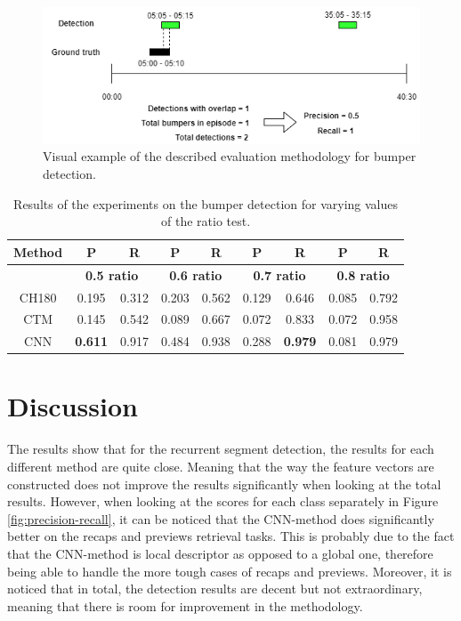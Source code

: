 \documentclass{article}
\begin{document}
\begin{figure}[H]
	\includegraphics[width=\textwidth]{images/evaluation-bumpers.png}
	\centering
	\caption{Visual example of the described evaluation methodology for bumper detection.}
	\label{fig:evaluation-example-bumpers}
\end{figure}

\begin{table}[H]
	\begin{center}
		\begin{tabular}{ c c c c c c c c c} 
			\hline
			\textbf{Method} & \textbf{P} & \textbf{R} & \textbf{P} & \textbf{R} & \textbf{P} & \textbf{R} & \textbf{P} & \textbf{R} \\
			\hline
			& \multicolumn{2}{c}{\textbf{0.5 ratio}} & \multicolumn{2}{c}{\textbf{0.6 ratio}} & \multicolumn{2}{c}{\textbf{0.7 ratio}} & \multicolumn{2}{c}{\textbf{0.8 ratio}} \\
			\hline
			CH180 			& 0.195				& 0.312 		& 0.203		& 0.562		& 0.129		& 0.646 	& 0.085 	& 0.792 \\
			CTM 			&  0.145			& 0.542 		& 0.089		& 0.667 	& 0.072		& 0.833 	& 0.072 	& 0.958 \\
			CNN 			& \textbf{0.611}	& 0.917			& 0.484		& 0.938 	& 0.288		& \textbf{0.979} 	& 0.081 	& 0.979 \\
			\hline
		\end{tabular}
	\end{center}
	\caption{Results of the experiments on the bumper detection for varying values of the ratio test.}
	\label{table:resultsbumpers}
\end{table}

\section{Discussion} \label{discussion}
The results show that for the recurrent segment detection, the results for each different method are quite close. Meaning that the way the feature vectors are constructed does not improve the results significantly when looking at the total results. However, when looking at the scores for each class separately in Figure \ref{fig:precision-recall}, it can be noticed that the CNN-method does significantly better on the recaps and previews retrieval tasks. This is probably due to the fact that the CNN-method is local descriptor as opposed to a global one, therefore being able to handle the more tough cases of recaps and previews. Moreover, it is noticed that in total, the detection results are decent but not extraordinary, meaning that there is room for improvement in the methodology. 
\end{document}
